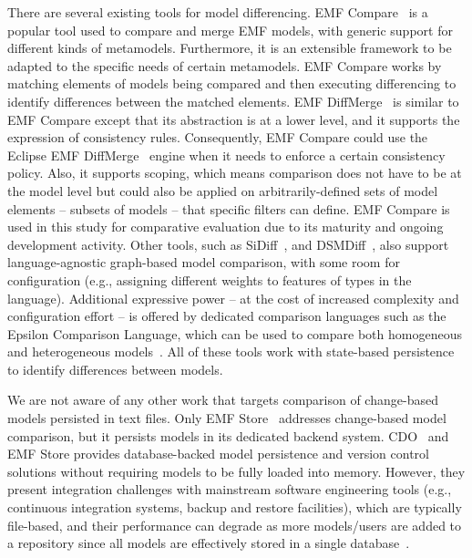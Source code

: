 There are several existing tools for model differencing. EMF Compare~\cite{emfcompare2018developer} is a popular tool used to compare and merge EMF models, with generic support for different kinds of metamodels. Furthermore, it is an extensible framework to be adapted to the specific needs of certain metamodels. EMF Compare works by matching elements of models being compared and then executing differencing to identify differences between the matched elements. EMF DiffMerge~\cite{eclipse2019emfdiffmerge} is similar to EMF Compare except that its abstraction is at a lower level, and it supports the expression of consistency rules. Consequently, EMF Compare could use the Eclipse EMF Diff\/Merge~\cite{eclipse2019emfdiffmerge} engine when it needs to enforce a certain consistency policy. Also, it supports scoping, which means comparison does not have to be at the model level but could also be applied on arbitrarily-defined sets of model elements -- subsets of models -- that specific filters can define. EMF Compare is used in this study for comparative evaluation due to its maturity and ongoing development activity. Other tools, such as SiDiff~\cite{Treude2007SiDiff}, and DSMDiff~\cite{lin2009dsmdiff}, also support language-agnostic graph-based model comparison, with some room for configuration (e.g., assigning different weights to features of types in the language). Additional expressive power -- at the cost of increased complexity and configuration effort -- is offered by dedicated comparison languages such as the Epsilon Comparison Language, which can be used to compare both homogeneous and heterogeneous models~\cite{kolovos2009ecl}. All of these tools work with state-based persistence to identify differences between models.

We are not aware of any other work that targets comparison of change-based models persisted in text files. Only EMF Store~\cite{koegel2010emfstore}  addresses change-based model comparison, but it persists models in its dedicated backend system. CDO~\cite{eclipse2019cdo} and EMF Store provides database-backed model persistence and version control solutions without requiring models to be fully loaded into memory. However, they present integration challenges with mainstream software engineering tools (e.g., continuous integration systems, backup and restore facilities), which are typically file-based, and their performance can degrade as more models/users are added to a repository since all models are effectively stored in a single database~\cite{KolovosRMPGCLRV13}. 

